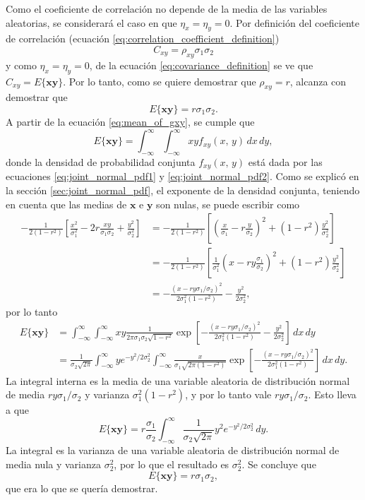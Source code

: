 \documentclass[a4paper]{report}
\newcommand{\x}{\mathbf{x}}
\newcommand{\y}{\mathbf{y}}
\begin{document}
Como el coeficiente de correlación no depende de la media de las variables aleatorias, se considerará el caso en que \(\eta_x=\eta_y=0\). Por definición del coeficiente de correlación (ecuación \ref{eq:correlation_coefficient_definition})
\[
 C_{xy}=\rho_{xy}\sigma_1\sigma_2
\]
y como \(\eta_x=\eta_y=0\), de la ecuación \ref{eq:covariance_definition} se ve que \(C_{xy}=E\{\x\y\}\). Por lo tanto, como se quiere demostrar que \(\rho_{xy}=r\), alcanza con demostrar que
\[
 E\{\x\y\}=r\sigma_1\sigma_2.
\]
A partir de la ecuación \ref{eq:mean_of_gxy}, se cumple que
\[
 E\{\x\y\}=\int_{-\infty}^{\infty}\int_{-\infty}^{\infty}xyf_{xy}(x,\,y)\,dx\,dy,
\]
donde la densidad de probabilidad conjunta \(f_{xy}(x,\,y)\) está dada por las ecuaciones \ref{eq:joint_normal_pdf1} y \ref{eq:joint_normal_pdf2}.
Como se explicó en la sección \ref{sec:joint_normal_pdf}, el exponente de la densidad conjunta, teniendo en cuenta que las medias de \(\x\) e \(\y\) son nulas, se puede escribir como
\begin{align*}
 -\frac{1}{2(1-r^2)}\left[\frac{x^2}{\sigma_1^2}-2r\frac{xy}{\sigma_1\sigma_2}+\frac{y^2}{\sigma_2^2}\right]
   &=-\frac{1}{2(1-r^2)}\left[\left(\frac{x}{\sigma_1}-r\frac{y}{\sigma_2}\right)^2+(1-r^2)\frac{y^2}{\sigma_2^2}\right]\\
   &=-\frac{1}{2(1-r^2)}\left[\frac{1}{\sigma_1^2}\left(x-ry\frac{\sigma_1}{\sigma_2}\right)^2+(1-r^2)\frac{y^2}{\sigma_2^2}\right]\\
   &=-\frac{(x-ry\sigma_1/\sigma_2)^2}{2\sigma_1^2(1-r^2)}-\frac{y^2}{2\sigma_2^2},
\end{align*}
por lo tanto
\begin{align*}
 E\{\x\y\}&=\int_{-\infty}^{\infty}\int_{-\infty}^{\infty}xy\frac{1}{2\pi\sigma_1\sigma_2\sqrt{1-r^2}}\exp\left[-\frac{(x-ry\sigma_1/\sigma_2)^2}{2\sigma_1^2(1-r^2)}-\frac{y^2}{2\sigma_2^2}\right]\,dx\,dy\\
   &=\frac{1}{\sigma_2\sqrt{2\pi}} \int_{-\infty}^{\infty}ye^{-y^2/2\sigma_2^2}\int_{-\infty}^{\infty}\frac{x}{\sigma_1\sqrt{2\pi(1-r^2)}}\exp\left[-\frac{(x-ry\sigma_1/\sigma_2)^2}{2\sigma_1^2(1-r^2)}\right]\,dx\,dy.
\end{align*}
La integral interna es la media de una variable aleatoria de distribución normal de media \(ry\sigma_1/\sigma_2\) y varianza \(\sigma_1^2(1-r^2)\), y por lo tanto vale \(ry\sigma_1/\sigma_2\). Esto lleva a que
\[
 E\{\x\y\}=r\frac{\sigma_1}{\sigma_2}\int_{-\infty}^{\infty}\frac{1}{\sigma_2\sqrt{2\pi}}y^2e^{-y^2/2\sigma_2^2}\,dy.
\]
La integral es la varianza de una variable aleatoria de distribución normal de media nula y varianza \(\sigma_2^2\), por lo que el resultado es \(\sigma_2^2\). Se concluye que
\[
 E\{\x\y\}=r\sigma_1\sigma_2,
\]
que era lo que se quería demostrar.
\end{document}
